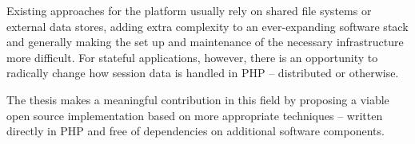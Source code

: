 Existing approaches for the platform usually rely on shared file systems or external data stores, adding extra complexity to an ever-expanding software stack and generally making the set up and maintenance of the necessary infrastructure more difficult. For stateful applications, however, there is an opportunity to radically change how session data is handled in PHP – distributed or otherwise.

The thesis makes a meaningful contribution in this field by proposing a viable open source implementation based on more appropriate techniques – written directly in PHP and free of dependencies on additional software components.
